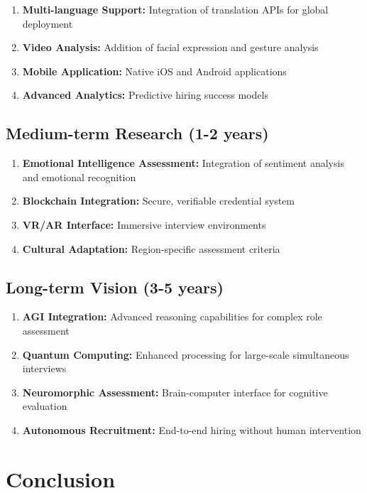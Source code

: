 \documentclass[conference]{IEEEtran}
\begin{document}
\begin{enumerate}
\item \textbf{Multi-language Support:} Integration of translation APIs for global deployment
\item \textbf{Video Analysis:} Addition of facial expression and gesture analysis
\item \textbf{Mobile Application:} Native iOS and Android applications
\item \textbf{Advanced Analytics:} Predictive hiring success models
\end{enumerate}

\subsection{Medium-term Research (1-2 years)}

\begin{enumerate}
\item \textbf{Emotional Intelligence Assessment:} Integration of sentiment analysis and emotional recognition
\item \textbf{Blockchain Integration:} Secure, verifiable credential system
\item \textbf{VR/AR Interface:} Immersive interview environments
\item \textbf{Cultural Adaptation:} Region-specific assessment criteria
\end{enumerate}

\subsection{Long-term Vision (3-5 years)}

\begin{enumerate}
\item \textbf{AGI Integration:} Advanced reasoning capabilities for complex role assessment
\item \textbf{Quantum Computing:} Enhanced processing for large-scale simultaneous interviews
\item \textbf{Neuromorphic Assessment:} Brain-computer interface for cognitive evaluation
\item \textbf{Autonomous Recruitment:} End-to-end hiring without human intervention
\end{enumerate}

\section{Conclusion}
\end{document}
